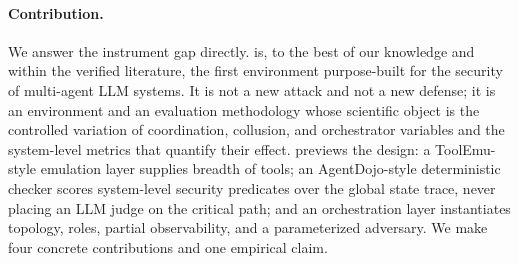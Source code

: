 \paragraph{Contribution.}
We answer the instrument gap directly.  is, to the best of our knowledge and
within the verified literature, the first environment purpose-built for the security
of multi-agent LLM systems. It is not a new attack and not a new defense; it is an
environment and an evaluation methodology whose scientific object is the controlled
variation of coordination, collusion, and orchestrator variables and the system-level
metrics that quantify their effect.  previews the design: a
ToolEmu-style emulation layer supplies breadth of tools; an AgentDojo-style
deterministic checker scores system-level security predicates over the global state
trace, never placing an LLM judge on the critical path; and an orchestration layer
instantiates topology, roles, partial observability, and a parameterized adversary. We
make four concrete contributions and one empirical claim.

